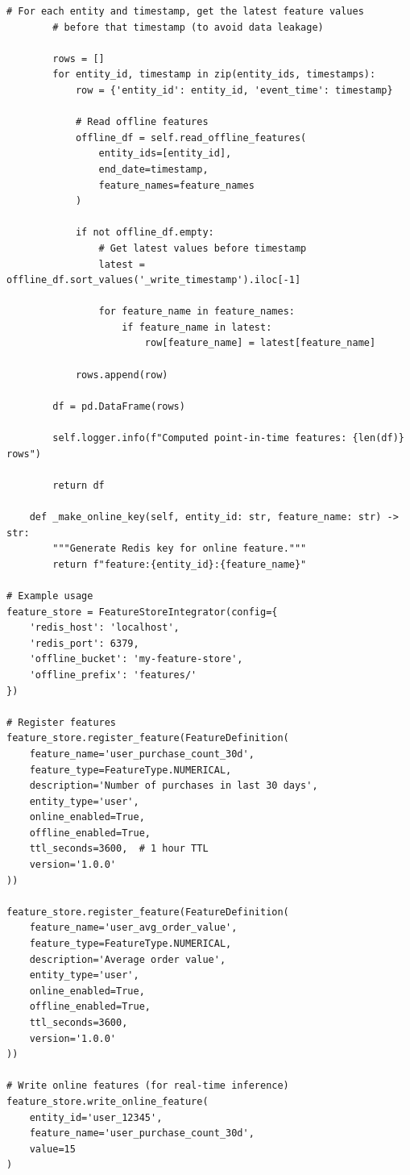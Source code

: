 \begin{lstlisting}[style=python, caption=FeatureStoreIntegrator with Dual Serving Modes]
        # For each entity and timestamp, get the latest feature values
        # before that timestamp (to avoid data leakage)

        rows = []
        for entity_id, timestamp in zip(entity_ids, timestamps):
            row = {'entity_id': entity_id, 'event_time': timestamp}

            # Read offline features
            offline_df = self.read_offline_features(
                entity_ids=[entity_id],
                end_date=timestamp,
                feature_names=feature_names
            )

            if not offline_df.empty:
                # Get latest values before timestamp
                latest = offline_df.sort_values('_write_timestamp').iloc[-1]

                for feature_name in feature_names:
                    if feature_name in latest:
                        row[feature_name] = latest[feature_name]

            rows.append(row)

        df = pd.DataFrame(rows)

        self.logger.info(f"Computed point-in-time features: {len(df)} rows")

        return df

    def _make_online_key(self, entity_id: str, feature_name: str) -> str:
        """Generate Redis key for online feature."""
        return f"feature:{entity_id}:{feature_name}"

# Example usage
feature_store = FeatureStoreIntegrator(config={
    'redis_host': 'localhost',
    'redis_port': 6379,
    'offline_bucket': 'my-feature-store',
    'offline_prefix': 'features/'
})

# Register features
feature_store.register_feature(FeatureDefinition(
    feature_name='user_purchase_count_30d',
    feature_type=FeatureType.NUMERICAL,
    description='Number of purchases in last 30 days',
    entity_type='user',
    online_enabled=True,
    offline_enabled=True,
    ttl_seconds=3600,  # 1 hour TTL
    version='1.0.0'
))

feature_store.register_feature(FeatureDefinition(
    feature_name='user_avg_order_value',
    feature_type=FeatureType.NUMERICAL,
    description='Average order value',
    entity_type='user',
    online_enabled=True,
    offline_enabled=True,
    ttl_seconds=3600,
    version='1.0.0'
))

# Write online features (for real-time inference)
feature_store.write_online_feature(
    entity_id='user_12345',
    feature_name='user_purchase_count_30d',
    value=15
)


\end{lstlisting}
